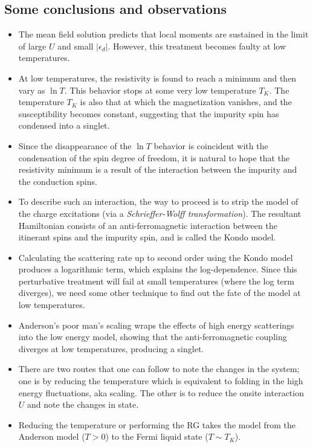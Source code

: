 \documentclass[twoside]{report}
\numberwithin{equation}{section}
\begin{document}
\subsection{Some conclusions and observations}
\begin{itemize}
	\item The mean field solution predicts that local moments are sustained in the limit of large \(U\) and small \(|\epsilon_d|\). However, this treatment becomes faulty at low temperatures.
	\item At low temperatures, the resistivity is found to reach a minimum and then vary as \(\ln T\). This behavior stops at some very low temperature \(T_K\). The temperature \(T_K\) is also that at which the magnetization vanishes, and the susceptibility becomes constant, suggesting that the impurity spin has condensed into a singlet.
	\item Since the disappearance of the \(\ln T\) behavior is coincident with the condensation of the spin degree of freedom, it is natural to hope that the resistivity minimum is a result of the interaction between the impurity and the conduction spins.
    \item To describe such an interaction, the way to proceed is to strip the model of the charge excitations (via a \textit{Schrieffer-Wolff transformation}).
The resultant Hamiltonian consists of an anti-ferromagnetic interaction between the itinerant spins and the impurity spin, and is called the Kondo model.
    \item Calculating the scattering rate up to second order using the Kondo model produces a logarithmic term, which explains the log-dependence. Since this perturbative treatment will fail at small temperatures (where the log term diverges), we need some other technique to find out the fate of the model at low temperatures.
    \item Anderson's poor man's scaling wraps the effects of high energy scatterings into the low energy model, showing that the anti-ferromagnetic coupling diverges at low temperatures, producing a singlet.
    \item There are two routes that one can follow to note the changes in the system; one is by reducing the temperature which is equivalent to folding in the high energy fluctuations, aka scaling.
	    The other is to reduce the onsite interaction \(U\) and note the changes in state.
    \item Reducing the temperature or performing the RG takes the model from the Anderson model (\(T>0\)) to the Fermi liquid state (\(T \sim T_K\)).

\end{itemize}
\end{document}
